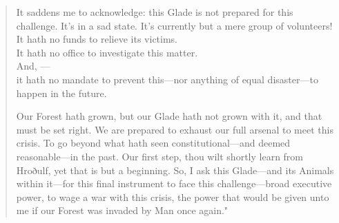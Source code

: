 \begin{quote}
		It saddens me to acknowledge: this Glade is not prepared for this challenge. It's in a sad state. It's currently but a mere group of volunteers!\\
		It hath no funds to relieve its victims.\\
		It hath no office to investigate this matter.\\
		And, ---\\
		it hath no mandate to prevent this---nor anything of equal disaster---to happen in the future.

		Our Forest hath grown, but our Glade hath not grown with it, and that must be set right. We are prepared to exhaust our full arsenal to meet this crisis. To go beyond what hath seen constitutional---and deemed reasonable---in the past. Our first step, thou wilt shortly learn from Hroðulf, yet that is but a beginning. So, I ask this Glade---and its Animals within it---for this final instrument to face this challenge---broad executive power, to wage a war with this crisis, the power that would be given unto me if our Forest was invaded by Man once again."
	\end{quote} 
\endgroup